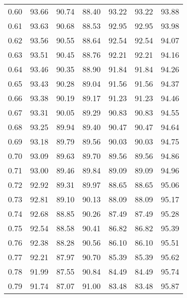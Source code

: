 \begin{tabular}{|c|c|c|c|c|c|c|}
      0.60 &     93.66 &     90.74 &      88.40 &   93.22 &      93.22 &         93.88 \\
      0.61 &     93.63 &     90.68 &      88.53 &   92.95 &      92.95 &         93.98 \\
      0.62 &     93.56 &     90.55 &      88.64 &   92.54 &      92.54 &         94.07 \\
      0.63 &     93.51 &     90.45 &      88.76 &   92.21 &      92.21 &         94.16 \\
      0.64 &     93.46 &     90.35 &      88.90 &   91.84 &      91.84 &         94.26 \\
      0.65 &     93.43 &     90.28 &      89.04 &   91.56 &      91.56 &         94.37 \\
      0.66 &     93.38 &     90.19 &      89.17 &   91.23 &      91.23 &         94.46 \\
      0.67 &     93.31 &     90.05 &      89.29 &   90.83 &      90.83 &         94.55 \\
      0.68 &     93.25 &     89.94 &      89.40 &   90.47 &      90.47 &         94.64 \\
      0.69 &     93.18 &     89.79 &      89.56 &   90.03 &      90.03 &         94.75 \\
      0.70 &     93.09 &     89.63 &      89.70 &   89.56 &      89.56 &         94.86 \\
      0.71 &     93.00 &     89.46 &      89.84 &   89.09 &      89.09 &         94.96 \\
      0.72 &     92.92 &     89.31 &      89.97 &   88.65 &      88.65 &         95.06 \\
      0.73 &     92.81 &     89.10 &      90.13 &   88.09 &      88.09 &         95.17 \\
      0.74 &     92.68 &     88.85 &      90.26 &   87.49 &      87.49 &         95.28 \\
      0.75 &     92.54 &     88.58 &      90.41 &   86.82 &      86.82 &         95.39 \\
      0.76 &     92.38 &     88.28 &      90.56 &   86.10 &      86.10 &         95.51 \\
      0.77 &     92.21 &     87.97 &      90.70 &   85.39 &      85.39 &         95.62 \\
      0.78 &     91.99 &     87.55 &      90.84 &   84.49 &      84.49 &         95.74 \\
      0.79 &     91.74 &     87.07 &      91.00 &   83.48 &      83.48 &         95.87 \\

\end{tabular}
